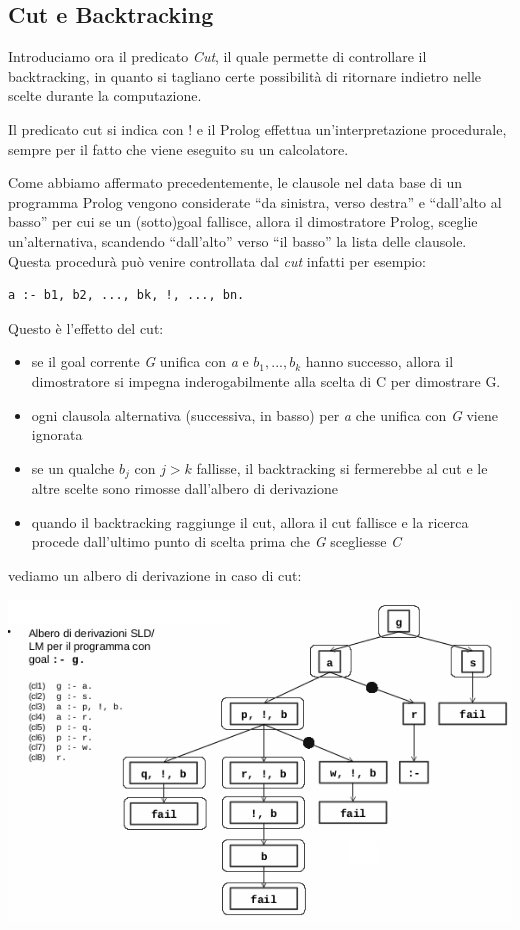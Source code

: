 \documentclass[a4paper]{report}
\begin{document}
\subsection{Cut e Backtracking}
Introduciamo ora il predicato \emph{Cut}, il quale permette di controllare il backtracking, in quanto si tagliano certe possibilità
di ritornare indietro nelle scelte durante la computazione.

Il predicato cut si indica con $!$ e il Prolog effettua un'interpretazione procedurale, sempre per il fatto che viene eseguito su un calcolatore.

Come abbiamo affermato precedentemente, le clausole nel data base di un programma Prolog vengono considerate “da sinistra, verso destra”
e “dall'alto al basso” per cui se un (sotto)goal fallisce, allora il dimostratore Prolog, sceglie un'alternativa,
scandendo “dall'alto” verso “il basso” la lista delle clausole.
Questa procedurà può venire controllata dal \textit{cut} infatti per esempio:
\begin{verbatim}
a :- b1, b2, ..., bk, !, ..., bn.
\end{verbatim}
Questo è l'effetto del cut:
\begin{itemize}
\item se il goal corrente \textit{G} unifica con \textit{a} e $b_1,...,b_k$ hanno successo,
      allora il dimostratore si impegna inderogabilmente alla scelta di C per dimostrare G.
\item ogni clausola alternativa (successiva, in basso) per \textit{a} che unifica con \textit{G} viene ignorata
\item se un qualche $b_j$ con $j > k$ fallisse, il backtracking si fermerebbe al cut e le altre scelte sono rimosse dall'albero di derivazione
\item quando il backtracking raggiunge il cut, allora il cut fallisce e la ricerca procede dall’ultimo punto di scelta
      prima che \textit{G} scegliesse \textit{C}
\end{itemize}
vediamo un albero di derivazione in caso di cut:
\begin{center}
	\includegraphics[scale=0.8]{img/cut.png}
\end{center}
\end{document}
